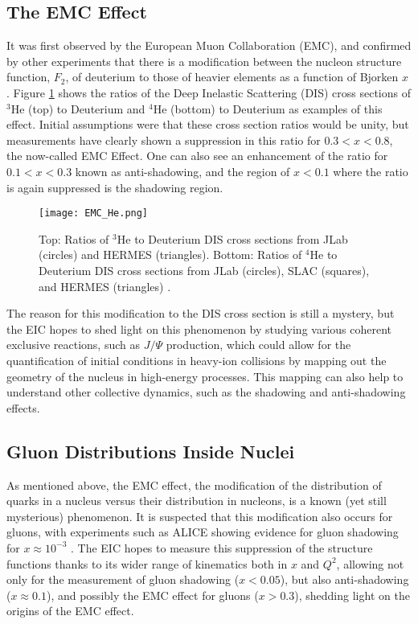 \subsection{The EMC Effect}
It was first observed by the European Muon Collaboration (EMC), and confirmed by other experiments that there is a modification between the nucleon structure function, $F_2$, of deuterium to those of heavier elements as a function of Bjorken $x$ \cite{SRC_EMC_effect}. Figure \ref{fig:emc_effect} shows the ratios of the Deep Inelastic Scattering (DIS) cross sections of ${}^3$He (top) to Deuterium and ${}^4$He (bottom) to Deuterium as examples of this effect. Initial assumptions were that these cross section ratios would be unity, but measurements have clearly shown a suppression in this ratio for $0.3 < x < 0.8$, the now-called EMC Effect. One can also see an enhancement of the ratio for $0.1 < x < 0.3$ known as anti-shadowing, and the region of $x < 0.1$ where the ratio is again suppressed is the shadowing region.

\begin{figure}[!htb]
	\centering
	\texttt{[image: EMC\_He.png]}
	\caption{Top: Ratios of ${}^3$He to Deuterium DIS cross sections from JLab (circles) and HERMES (triangles). Bottom: Ratios of ${}^4$He to Deuterium DIS cross sections from JLab (circles), SLAC (squares), and HERMES (triangles) \cite{EMC_Challenge}.}
	\label{fig:emc_effect}
\end{figure}

The reason for this modification to the DIS cross section is still a mystery, but the EIC hopes to shed light on this phenomenon by studying various coherent exclusive reactions, such as $J/\Psi$ production, which could allow for the quantification of initial conditions in heavy-ion collisions by mapping out the geometry of the nucleus in high-energy processes. This mapping can also help to understand other collective dynamics, such as the shadowing and anti-shadowing effects.

\subsection{Gluon Distributions Inside Nuclei}
As mentioned above, the EMC effect, the modification of the distribution of quarks in a nucleus versus their distribution in nucleons, is a known (yet still mysterious) phenomenon. It is suspected that this modification also occurs for gluons, with experiments such as ALICE showing evidence for gluon shadowing for $x \approx 10^{-3}$ \cite{ALICE_antishadowing}. The EIC hopes to measure this suppression of the structure functions thanks to its wider range of kinematics both in $x$ and $Q^2$, allowing not only for the measurement of gluon shadowing ($x < 0.05$), but also anti-shadowing ($x \approx 0.1$), and possibly the EMC effect for gluons ($x > 0.3$), shedding light on the origins of the EMC effect.

